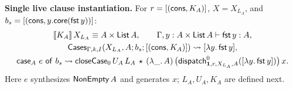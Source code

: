 \textbf{Single live clause instantiation.}
For $r=[(\mathsf{cons},K_A)]$, $X=X_{L_A}$, and
$b_s=[(\mathsf{cons},y.\mathsf{core}(\mathsf{fst}\,y))]$:
\[
\begin{gathered}
 \llbracket K_A\rrbracket\,X_{L_A}\equiv A\times\mathsf{List}\,A,\qquad
 \Gamma,y:A\times\mathsf{List}\,A\vdash\mathsf{fst}\,y:A,\\
 \mathsf{Cases}_{\Gamma,k,I}(X_{L_A},A;b_s;[(\mathsf{cons},K_A)])\rightsquigarrow [\lambda y.\,\mathsf{fst}\,y],\\
 \mathsf{case}_{A}\ e\ \mathsf{of}\ b_s
 \rightsquigarrow
 \mathsf{closeCase}_0\,U_A\,L_A\,\star\,(\lambda\_.\,A)\,
   \bigl(\mathsf{dispatch}^{0}_{\mathbf{1},r,X_{L_A},A}
      ([\lambda y.\,\mathsf{fst}\,y])\bigr)\,x.
\end{gathered}
\]
Here $e$ synthesizes $\mathsf{NonEmpty}\,A$ and generates $x$;
$L_A,U_A,K_A$ are defined next.
